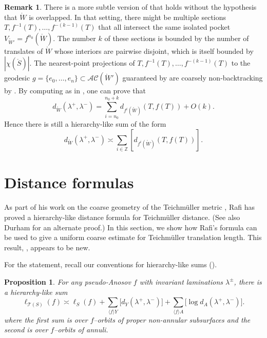 \documentclass[11pt,letterpaper]{amsart}
\newcommand{\ZZ}[0]{\mathbb{Z}}
\newcommand{\mr}{\mathring}
\newcommand{\psub}{\mr W}
\numberwithin{equation}{section}
\newtheorem{proposition}[theorem]{Proposition}
\theoremstyle{definition}
\newtheorem{remark}[theorem]{Remark}
\newcommand{\T}{\mathcal{T}}
\newcommand{\AC}{\mathcal{AC}}
\begin{document}
\begin{remark}\label{Rem:fSectionSumWithoutOverlap}
There is a more subtle version of 
  that holds without the hypothesis that $\psub$ is overlapped. In that setting, there might be multiple sections $T, f^{-1}(T), \ldots, f^{-(k-1)}(T)$ that all intersect the same isolated pocket $V_{\psub'} = f^{n_0}(\psub)$. The number $k$ of these sections is bounded by the number of translates of $\psub$ whose interiors are pairwise disjoint, which is itself bounded by $|\chi(\mr S)|$. The nearest-point projections of $T, f^{-1}(T), \ldots, f^{-(k-1)}(T)$ to the geodesic $g = \{e_0, \ldots, e_n \} \subset \AC(\psub')$ guaranteed by  are coarsely non-backtracking by .
By computing as in , one can prove that
\[
d_{\psub}(\lambda^+,\lambda^-) = \sum_{i=n_0}^{n_0+k} d_{f^i(\psub)}(T, f(T)) + O(k).
\]
Hence there is still a hierarchy-like sum of the form 
\[
d_{\psub}(\lambda^+, \lambda^-)  \asymp \sum_{i \in \ZZ} \left[ d_{f^i(\psub)}(T, f(T)) \right]_{}.
\]

\end{remark}



\section{Distance formulas}\label{Sec:DistanceFormulas}
As part of his 
work on the coarse geometry of the Teichm\"uller metric \cite{Rafi:Combinatorial}, Rafi has proved a hierarchy-like distance formula for Teichm\"uller distance. (See also Durham \cite[Theorem 7.4.7]{Durham:AugmentedMarkingComplex} for an alternate proof.) In this section, we show how Rafi's formula can be used to give a uniform coarse estimate for Teichm\"uller translation length. This result, , appears to be new.

For the statement, recall our conventions for hierarchy-like sums ().

\begin{proposition}\label{Prop:RafiInterpreted}
 For any pseudo-Anosov $f$ with invariant laminations $\lambda^\pm$, there is a hierarchy-like sum
\[
\ell_{\T(S)}(f) \asymp \ell_{S}(f) + \sum_{\langle f \rangle Y} \big[ d_Y(\lambda^+,\lambda^-) \big] + \sum_{\langle f \rangle A} \big[ \log  d_A(\lambda^+,\lambda^-) \big].
\]
where the first sum is over $f$--orbits of proper non-annular subsurfaces and the second is over $f$--orbits of annuli. 
\end{proposition}
\end{document}

